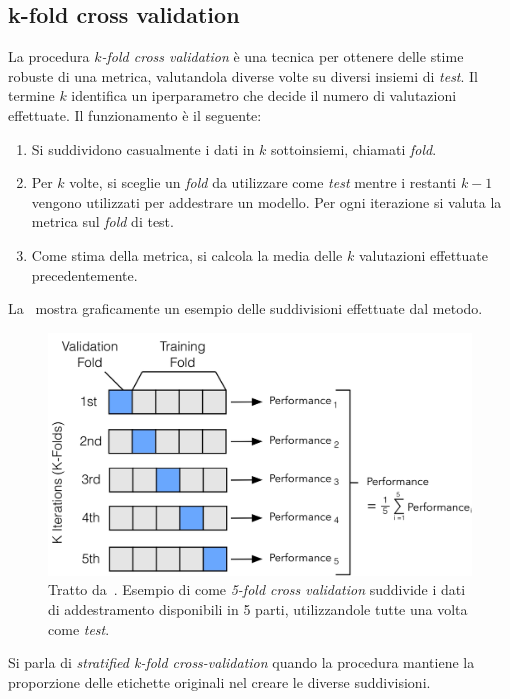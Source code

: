 \subsection{k-fold cross validation}
La procedura $k$\emph{-fold cross validation} è una tecnica per ottenere delle stime robuste di una metrica, valutandola diverse volte su diversi insiemi di \emph{test}.
Il termine $k$ identifica un iperparametro che decide il numero di valutazioni effettuate.
Il funzionamento è il seguente:
\begin{enumerate}
    \item Si suddividono casualmente i dati in $k$ sottoinsiemi, chiamati \emph{fold}.
    \item Per $k$ volte, si sceglie un \emph{fold} da utilizzare come \emph{test} mentre i restanti $k-1$ vengono utilizzati per addestrare un modello. Per ogni iterazione si valuta la metrica sul \emph{fold} di test.
    \item Come stima della metrica, si calcola la media delle $k$ valutazioni effettuate precedentemente.
\end{enumerate}
La~ mostra graficamente un esempio delle suddivisioni effettuate dal metodo.
\begin{figure}
    \centering
    \includegraphics[width=0.7\linewidth]{img/kfoldCV.jpg}
    \caption[Esempio \emph{5-fold cross-validation}.]{Tratto da~\cite{model_evaluation}. Esempio di come \emph{5-fold cross validation} suddivide i dati di addestramento disponibili in 5 parti, utilizzandole tutte una volta come \emph{test}.}
    \label{fig:kfoldcv}
\end{figure}
Si parla di \emph{stratified k-fold cross-validation} quando la procedura mantiene la proporzione delle etichette originali nel creare le diverse suddivisioni.


